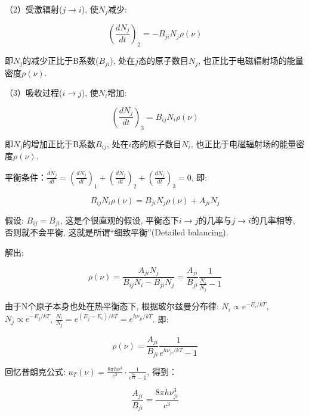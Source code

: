 （2）受激辐射($j \to i$), 使$N_j$减少:

\begin{equation*}
\left( \frac{dN_j}{dt} \right)_2 = - B_{ji}N_j \rho(\nu)
\end{equation*}

即$N_j$的减少正比于B系数($B_{ji}$), 处在$j$态的原子数目$N_j$,
也正比于电磁辐射场的能量密度$\rho(\nu)$.

（3）吸收过程($i \to j$), 使$N_i$增加:

\begin{equation*}
\left( \frac{dN_j}{dt} \right)_3 = B_{ij}N_i \rho(\nu)
\end{equation*}

即$N_j$的增加正比于B系数$B_{ij}$, 处在$i$态的原子数目$N_i$,
也正比于电磁辐射场的能量密度$\rho(\nu)$.

平衡条件：$\frac{dN_j}{dt}=\left( \frac{dN_j}{dt} \right)_1 + \left(
\frac{dN_j}{dt} \right)_2 + \left( \frac{dN_j}{dt} \right)_3 = 0$,
即:

\begin{equation}\label{equilibrium condition for AB}
B_{ij}N_i \rho(\nu) = B_{ji}N_j \rho(\nu) + A_{ji}N_j
\end{equation}

假设: $B_{ij}=B_{ji}$, 这是个很直观的假设, 平衡态下$i \to
j$的几率与$j \to i$的几率相等, 否则就不会平衡,
这就是所谓``细致平衡''(Detailed balancing).


解出:

\begin{equation*}
\rho(\nu) = \frac{A_{ji}N_j}{B_{ij}N_i -
B_{ji}N_j}=\frac{A_{ji}}{B_{ji}}\frac{1}{\frac{N_i}{N_j}-1}
\end{equation*}

由于N个原子本身也处在热平衡态下, 根据玻尔兹曼分布律: $N_i \propto
e^{-E_i/kT}$, $N_j \propto e^{-E_j/kT}$, $\frac{N_i}{N_j} =
e^{(E_j-E_i)/kT}=e^{h\nu_{ji}/kT}$. 即:

\begin{equation*}
\rho(\nu) =\frac{A_{ji}}{B_{ji}}\frac{1}{e^{h\nu_{ji}/kT}-1}
\end{equation*}

回忆普朗克公式: $u_T (\nu ) = \frac{{8\pi h\nu ^3 }}{{c^3 }} \cdot
\frac{1}{{e^{\frac{{h\nu }}{{k T}}}  - 1}}$, 得到：

\begin{equation*}
\frac{A_{ji}}{B_{ji}}=\frac{{8\pi h\nu_{ji} ^3 }}{{c^3 }}
\end{equation*}


